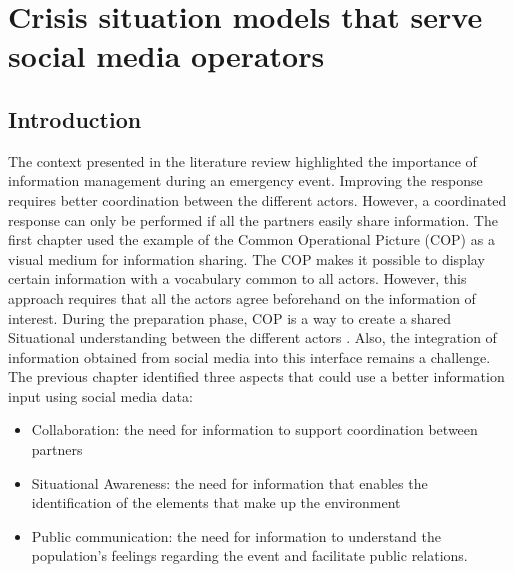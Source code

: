 \chapter{Crisis situation models that serve social media operators}

\section*{Introduction}
The context presented in the literature review highlighted the importance of information management during an emergency event.
Improving the response requires better coordination between the different actors.
However, a coordinated response can only be performed if all the partners easily share information.
The first chapter used the example of the Common Operational Picture (COP) as a visual medium for information sharing.
The COP makes it possible to display certain information with a vocabulary common to all actors.
However, this approach requires that all the actors agree beforehand on the information of interest.
During the preparation phase, COP is a way to create a shared Situational understanding between the different actors \parencite{steen-tveitCommonOperationalPicture2021}.
Also, the integration of information obtained from social media into this interface remains a challenge.
The previous chapter identified three aspects that could use a better information input using social media data:

\begin{itemize}
    \item Collaboration: the need for information to support coordination between partners
    \item Situational Awareness: the need for information that enables the identification of the elements that make up the environment
    \item Public communication: the need for information to understand the population's feelings regarding the event and facilitate public relations.
\end{itemize}

